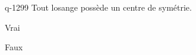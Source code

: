 \begin{truefalse}{q-1299}
Tout losange possède un centre de symétrie.
\item* Vrai
\item Faux
\end{truefalse}

